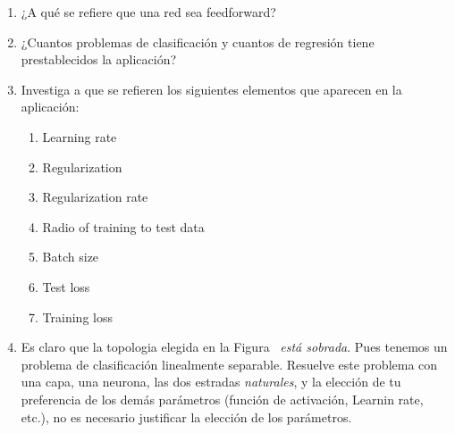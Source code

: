 \documentclass[10pt]{article}
\begin{document}
\begin{enumerate}%

\item{}
¿A qué se refiere que una red sea feedforward?%

\item{}
¿Cuantos problemas de clasificación y cuantos de regresión tiene prestablecidos la aplicación?%

\item{}
Investiga a que se refieren los siguientes elementos que aparecen en la aplicación:%

\begin{enumerate}[noitemsep,topsep=\mdcompacttopsep,label=\alph*.]%

\item{}Learning rate%

\item{}Regularization%

\item{}Regularization rate%

\item{}Radio of training to test data%

\item{}Batch size%

\item{}Test loss%

\item{}Training loss%
\end{enumerate}%

\item{}
Es claro que la topologia elegida en la Figura~ \emph{está sobrada}. Pues tenemos un problema de clasificación 
linealmente separable. Resuelve este problema con una capa, una neurona, las dos estradas \emph{naturales},
y la elección de tu preferencia de los demás 
parámetros (función de activación, Learnin rate, etc.), no es necesario justificar la elección de los parámetros.%


\end{enumerate}
\end{document}
